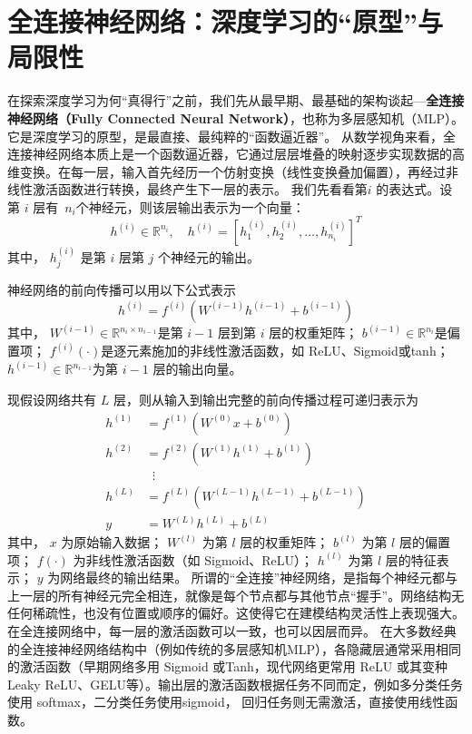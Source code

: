 \section{全连接神经网络：深度学习的“原型”与局限性}


在探索深度学习为何“真得行”之前，我们先从最早期、最基础的架构谈起---{\bf 全连接神经网络（Fully Connected Neural Network）}，也称为多层感知机（MLP）。它是深度学习的原型，是最直接、最纯粹的“函数逼近器”。
从数学视角来看，全连接神经网络本质上是一个函数逼近器，它通过层层堆叠的映射逐步实现数据的高维变换。在每一层，输入首先经历一个仿射变换（线性变换叠加偏置），再经过非线性激活函数进行转换，最终产生下一层的表示。
我们先看看第\( i \) 的表达式。设第 \( i \)  层有~$ n_i$个神经元，则该层输出表示为一个向量：
  \[
h^{(i)} \in \mathbb{R}^{n_i}, \quad h^{(i)} = \left[h^{(i)}_1, h^{(i)}_2, \dots, h^{(i)}_{n_i} \right]^T
\]
其中，  \( h^{(i)}_j \) 是第 \( i \) 层第 \( j \) 个神经元的输出。


神经网络的前向传播可以用以下公式表示
\[
h^{(i)} = f^{(i)}\left( W^{(i-1)} h^{(i-1)} + b^{(i-1)} \right)
\]
其中，
\( W^{(i-1)} \in \mathbb{R}^{n_i \times n_{i-1}} \)是第 \( i-1 \) 层到第 \( i \) 层的权重矩阵；
 \( b^{(i-1)} \in \mathbb{R}^{n_i} \)是偏置项；
 \( f^{(i)}(\cdot) \)是逐元素施加的非线性激活函数，如 ReLU、Sigmoid或tanh；
 \( h^{(i-1)} \in \mathbb{R}^{n_{i-1}} \)为第 \( i-1 \) 层的输出向量。

现假设网络共有 \( L \) 层，则从输入到输出完整的前向传播过程可递归表示为
\[
\begin{aligned}
h^{(1)} &= f^{(1)} \left(W^{(0)}x + b^{(0)}\right)\\[6pt]
h^{(2)} &= f^{(2)} \left(W^{(1)}h^{(1)} + b^{(1)}\right)\\[6pt]
&\;\;\vdots\\[6pt]
h^{(L)} &= f^{(L)} \left(W^{(L-1)}h^{(L-1)} + b^{(L-1)}\right)\\[6pt]
y &= W^{(L)}h^{(L)} + b^{(L)}
\end{aligned}
\]
其中，
 \(x\) 为原始输入数据；
\(W^{(l)}\) 为第 \(l\) 层的权重矩阵；
 \(b^{(l)}\) 为第 \(l\) 层的偏置项；
 \(f(\cdot)\) 为非线性激活函数（如 Sigmoid、ReLU）；
 \(h^{(l)}\) 为第 \(l\) 层的特征表示；
 \(y\) 为网络最终的输出结果。
所谓的“全连接”神经网络，是指每个神经元都与上一层的所有神经元完全相连，就像是每个节点都与其他节点“握手”。网络结构无任何稀疏性，也没有位置或顺序的偏好。这使得它在建模结构灵活性上表现强大。
在全连接网络中，每一层的激活函数可以一致，也可以因层而异。
在大多数经典的全连接神经网络结构中（例如传统的多层感知机MLP），各隐藏层通常采用相同的激活函数（早期网络多用 Sigmoid 或Tanh，现代网络更常用 ReLU 或其变种Leaky ReLU、GELU等）。输出层的激活函数根据任务不同而定，例如多分类任务使用 softmax，二分类任务使用sigmoid， 回归任务则无需激活，直接使用线性函数。
